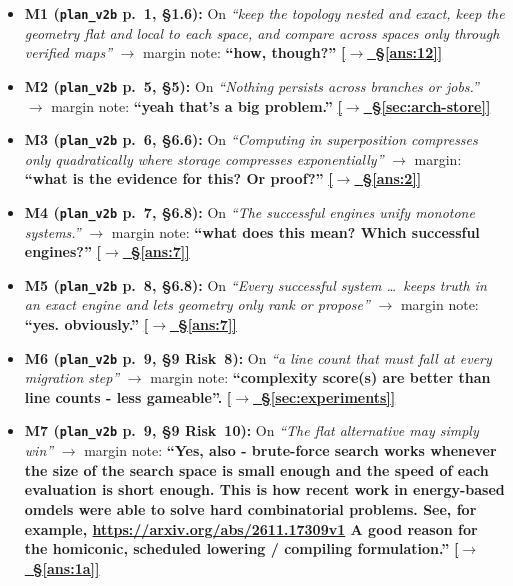\documentclass[12pt]{article}
\newcommand{\qtoans}[2]{\hyperref[#1]{\textcolor{qpurple}{\textbf{\small[\(\rightarrow\)~#2]}}}}
\begin{document}
\begin{itemize}[leftmargin=1.6em, itemsep=0.2em]
  \item \hypertarget{q:m1}{}\textbf{M1 (\texttt{plan\_v2b} p.~1, \S1.6):} On \emph{``keep the topology nested and exact, keep the geometry flat and local to each space, and compare across spaces only through verified maps''} $\to$ margin note: \textbf{``how, though?''} \qtoans{ans:12}{\S\ref{ans:12}}
  \item \hypertarget{q:m2}{}\textbf{M2 (\texttt{plan\_v2b} p.~5, \S5):} On \emph{``Nothing persists across branches or jobs.''} $\to$ margin note: \textbf{``yeah that's a big problem.''} \qtoans{sec:arch-store}{\S\ref{sec:arch-store}}
  \item \hypertarget{q:m3}{}\textbf{M3 (\texttt{plan\_v2b} p.~6, \S6.6):} On \emph{``Computing in superposition compresses only quadratically where storage compresses exponentially''} $\to$ margin: \textbf{``what is the evidence for this? Or proof?''} \qtoans{ans:2}{\S\ref{ans:2}}
  \item \hypertarget{q:m4}{}\textbf{M4 (\texttt{plan\_v2b} p.~7, \S6.8):} On \emph{``The successful engines unify monotone systems.''} $\to$ margin note: \textbf{``what does this mean? Which successful engines?''} \qtoans{ans:7}{\S\ref{ans:7}}
  \item \hypertarget{q:m5}{}\textbf{M5 (\texttt{plan\_v2b} p.~8, \S6.8):} On \emph{``Every successful system \dots\ keeps truth in an exact engine and lets geometry only rank or propose''} $\to$ margin note: \textbf{``yes. obviously.''} \qtoans{ans:7}{\S\ref{ans:7}}
  \item \hypertarget{q:m6}{}\textbf{M6 (\texttt{plan\_v2b} p.~9, \S9 Risk~8):} On \emph{``a line count that must fall at every migration step''} $\to$ margin note: \textbf{``complexity score(s) are better than line counts - less gameable''.} \qtoans{sec:experiments}{\S\ref{sec:experiments}}
  \item \hypertarget{q:m7}{}\textbf{M7 (\texttt{plan\_v2b} p.~9, \S9 Risk~10):} On \emph{``The flat alternative may simply win''} $\to$ margin note: \textbf{``Yes, also - brute-force search works whenever the size of the search space is small enough and the speed of each evaluation is short enough. This is how recent work in energy-based omdels were able to solve hard combinatorial problems. See, for example, \url{https://arxiv.org/abs/2611.17309v1} A good reason for the homiconic, scheduled lowering / compiling formulation.''} \qtoans{ans:1a}{\S\ref{ans:1a}}
\end{itemize}
\end{document}
